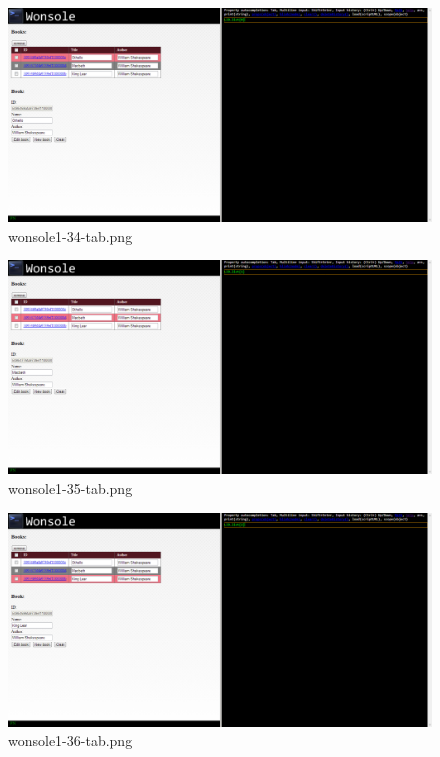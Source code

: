 \begin{figure}
\includegraphics[width=\textwidth]{screenshot/wonsole1-34-tab.png}
\caption{wonsole1-34-tab.png}
\label{wonsole1-34-tab.png}
\end{figure}


\clearpage
\begin{figure}
\includegraphics[width=\textwidth]{screenshot/wonsole1-35-tab.png}
\caption{wonsole1-35-tab.png}
\label{wonsole1-35-tab.png}
\end{figure}


\begin{figure}
\includegraphics[width=\textwidth]{screenshot/wonsole1-36-tab.png}
\caption{wonsole1-36-tab.png}
\label{wonsole1-36-tab.png}
\end{figure}


